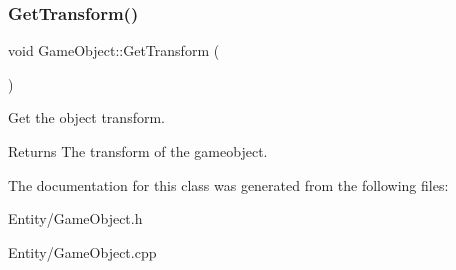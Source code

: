 \subsubsection{\texorpdfstring{Get\+Transform()}{GetTransform()}}
{\footnotesize\ttfamily void Game\+Object\+::\+Get\+Transform (\begin{DoxyParamCaption}{ }\end{DoxyParamCaption})}



Get the object transform. 

\begin{DoxyReturn}{Returns}
The transform of the gameobject. 
\end{DoxyReturn}


The documentation for this class was generated from the following files\+:\begin{DoxyCompactItemize}
\item 
Entity/Game\+Object.\+h\item 
Entity/Game\+Object.\+cpp\end{DoxyCompactItemize}
